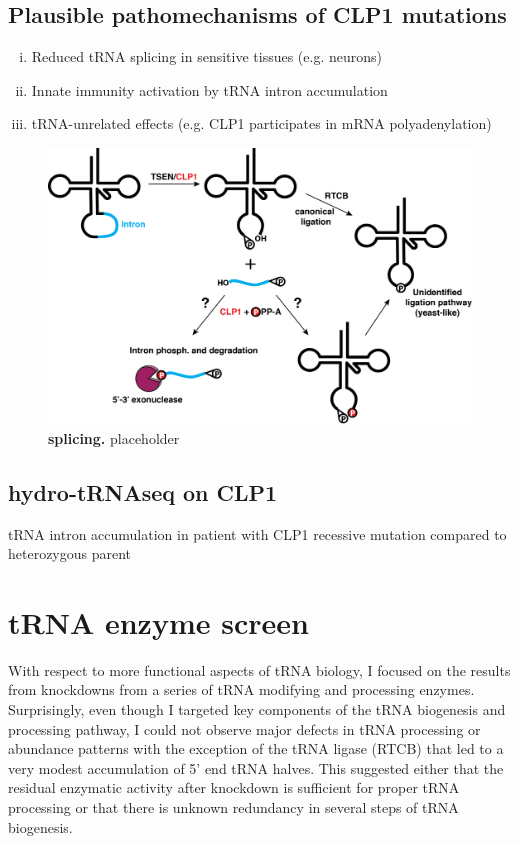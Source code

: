 \documentclass[12pt]{rockefeller}
\begin{document}
\subsection{Plausible pathomechanisms of CLP1 mutations}
\begin{enumerate}[i)]
\item Reduced tRNA splicing in sensitive tissues (e.g. neurons)
\item Innate immunity activation by tRNA intron accumulation
\item tRNA-unrelated effects (e.g. CLP1 participates in mRNA polyadenylation)
\end{enumerate}

\begin{figure}[!ht]%
\centering
\includegraphics[width=\textwidth]{splicing2_v2.png}%
\caption[spliciing]
{\textbf{splicing.}
placeholder}
\centering
\label{splicing}%
\end{figure}

\subsection{hydro-tRNAseq on CLP1}
tRNA intron accumulation in patient with CLP1 recessive mutation compared to heterozygous parent

\section{tRNA enzyme screen}
With respect to more functional aspects of tRNA biology, I focused on the results from knockdowns from a series of tRNA modifying and processing enzymes. Surprisingly, even though I targeted key components of the tRNA biogenesis and processing pathway, I could not observe major defects in tRNA processing or abundance patterns with the exception of the tRNA ligase (RTCB) that led to a very modest accumulation of 5’ end tRNA halves. This suggested either that the residual enzymatic activity after knockdown is sufficient for proper tRNA processing or that there is unknown redundancy in several steps of tRNA biogenesis. 
\end{document}
